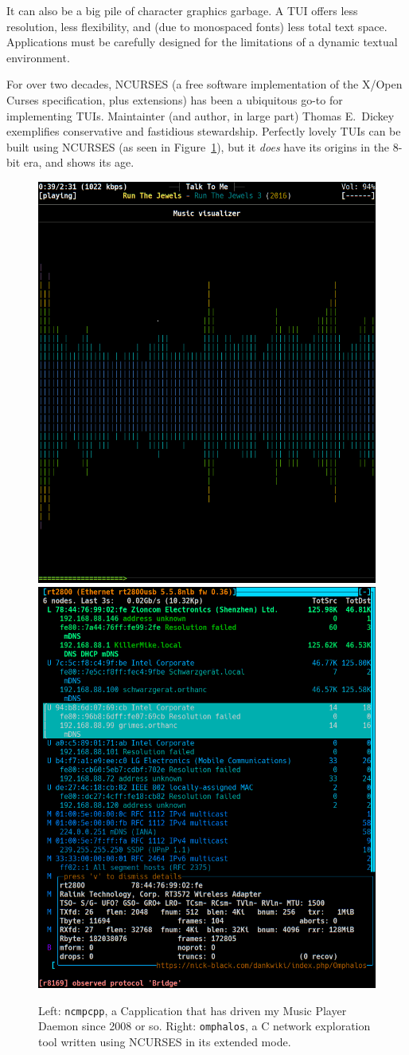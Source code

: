\documentclass[letterpaper,10pt]{article}
\newcommand\CC{C\nolinebreak\hspace{-.05em}\raisebox{.4ex}{\relsize{-3}{\textbf{+}}}\nolinebreak\hspace{-.10em}\raisebox{.4ex}{\relsize{-3}{\textbf{+}}}\hspace{.2em}}
\begin{document}
It can also be a big pile of character graphics garbage. A TUI offers
less resolution, less flexibility, and (due to monospaced fonts) less total
text space. Applications must be carefully designed for the limitations of
a dynamic textual environment.

For over two decades, NCURSES (a free software implementation of the X/Open Curses\cite{cursesosi}
specification, plus extensions\cite{ncursesfaq}) has been a ubiquitous go-to for implementing
TUIs. Maintainter (and author, in large part) Thomas E.\ Dickey
exemplifies conservative and fastidious stewardship. Perfectly lovely TUIs can
be built using NCURSES (as seen in Figure~\ref{fig:ncurses-tuis}), but it \textit{does}
have its origins in the 8-bit era, and shows its age.

\begin{figure}[!hbtp]
  \centering
    \includegraphics[width=.4\linewidth]{media/tui-ncmpcpp.png}
    \hfill
    \includegraphics[width=.4\linewidth]{media/tui-omphalos.png}
    \caption[NCURSES TUIs: Ncmpcpp and Omphalos.]
    {Left: \texttt{ncmpcpp}, a \CC application
      that has driven my Music Player Daemon since 2008 or so.
      Right: \texttt{omphalos}, a C network exploration tool
      written using NCURSES in its extended mode.}
  \label{fig:ncurses-tuis}
\end{figure}
\end{document}
